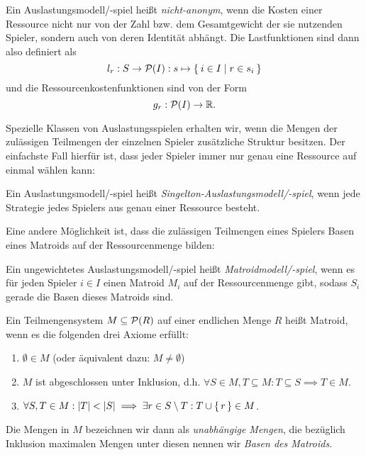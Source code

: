 \begin{defn}
	Ein Auslastungsmodell/-spiel heißt \emph{nicht-anonym}, wenn die Kosten einer Ressource nicht nur von der Zahl bzw. dem Gesamtgewicht der sie nutzenden Spieler, sondern auch von deren Identität abhängt. Die Lastfunktionen sind dann also definiert als
		\[l_r: S \to \mathcal{P}(I): s \mapsto \Set{i \in I | r \in s_i }\]
	und die Ressourcenkostenfunktionen sind von der Form
		\[g_r: \mathcal{P}(I) \to \mathbb{R}. \]
\end{defn}

Spezielle Klassen von Auslastungsspielen erhalten wir, wenn die Mengen der zulässigen Teilmengen der einzelnen Spieler zusätzliche Struktur besitzen. Der einfachste Fall hierfür ist, dass jeder Spieler immer nur genau eine Ressource auf einmal wählen kann:

\begin{defn}
	Ein Auslastungsmodell/-spiel heißt \emph{Singelton-Auslastungsmodell/-spiel}, wenn jede Strategie jedes Spielers aus genau einer Ressource besteht.
\end{defn}

Eine andere Möglichkeit ist, dass die zulässigen Teilmengen eines Spielers Basen eines Matroids auf der Ressourcenmenge bilden:

\begin{defn}
	Ein ungewichtetes Auslastungsmodell/-spiel heißt \emph{Matroidmodell/-spiel}, wenn es für jeden Spieler $i \in I$ einen Matroid $M_i$ auf der Ressourcenmenge gibt, sodass $S_i$ gerade die Basen dieses Matroids sind.
\end{defn}

\begin{defn}
	Ein Teilmengensystem $M \subseteq \mathcal{P}(R)$ auf einer endlichen Menge $R$ heißt Matroid, wenn es die folgenden drei Axiome erfüllt:
	\begin{enumerate}
		\item $\emptyset \in M$ (oder äquivalent dazu: $M \neq \emptyset$)
		\item $M$ ist abgeschlossen unter Inklusion, d.h. $\forall S \in M, T \subseteq M: T \subseteq S \implies T \in M$.
		\item $\forall S, T \in M: \left|T\right| < \left|S\right| \implies \exists r \in S \setminus T: T \cup \set{r} \in M$.
	\end{enumerate}
	Die Mengen in $M$ bezeichnen wir dann als \emph{unabhängige Mengen}, die bezüglich Inklusion maximalen Mengen unter diesen nennen wir \emph{Basen des Matroids}.
\end{defn}

